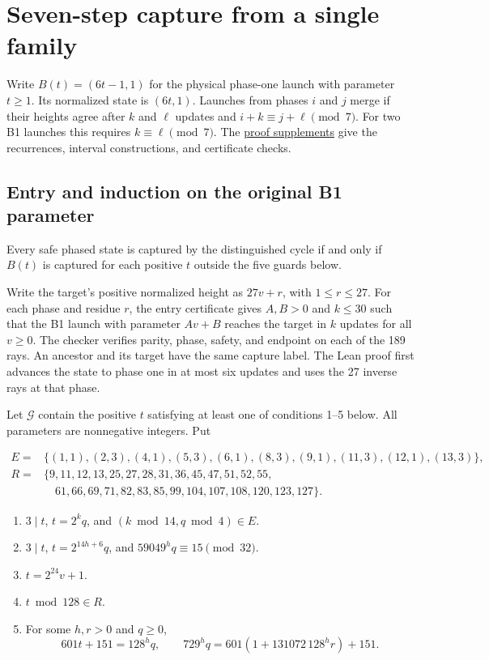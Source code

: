 \section{Seven-step capture from a single family}
\label{sec:frontier-update}

Write $B(t)=(6t-1,1)$ for the physical phase-one launch with parameter
$t\ge1$. Its normalized state is $(6t,1)$. Launches from phases $i$ and $j$ merge if their
heights agree after $k$ and $\ell$ updates and $i+k\equiv j+\ell\pmod7$.
For two B1 launches this requires $k\equiv\ell\pmod7$. The
\href{https://github.com/bruscaj/perturbed_collatz/tree/main/certificates/frontier}{proof supplements}
give the recurrences, interval constructions, and certificate checks.

\subsection{Entry and induction on the original B1 parameter}
\label{sec:b1-complement}

\begin{theorem}\label{thm:b1-complement}
Every safe phased state is captured by the distinguished cycle if and only
if $B(t)$ is captured for each positive $t$ outside the five guards below.
\end{theorem}

Write the target's positive normalized height as $27v+r$, with
$1\le r\le27$. For each phase and residue $r$, the entry certificate
gives $A,B>0$ and $k\le30$ such that the B1 launch with parameter
$Av+B$ reaches the target in $k$ updates for all $v\ge0$. The checker
verifies parity, phase, safety, and endpoint on each of the 189 rays.
An ancestor and its target have the same capture label. The Lean proof
first advances the state to phase one in at most six updates and uses
the 27 inverse rays at that phase.

Let $\mathcal G$ contain the positive $t$ satisfying at least one of
conditions 1--5 below. All parameters are nonnegative integers. Put

\[
\begin{split}
 E={}&\{(1,1),(2,3),(4,1),(5,3),(6,1),(8,3),(9,1),(11,3),(12,1),(13,3)\},\\
 R={}&\{9,11,12,13,25,27,28,31,36,45,47,51,52,55,\\
     &\hspace{1em}61,66,69,71,82,83,85,99,104,107,108,120,123,127\}.
\end{split}
\]
\begin{enumerate}
\item $3\mid t$, $t=2^kq$, and $(k\bmod14,q\bmod4)\in E$.
\item $3\mid t$, $t=2^{14h+6}q$, and $59049^hq\equiv15\pmod{32}$.
\item $t=2^{24}v+1$.
\item $t\bmod128\in R$.
\item For some $h,r>0$ and $q\ge0$,
\[
 601t+151=128^h q,\qquad 729^h q=601(1+131072\,128^h r)+151.
\]
\end{enumerate}

